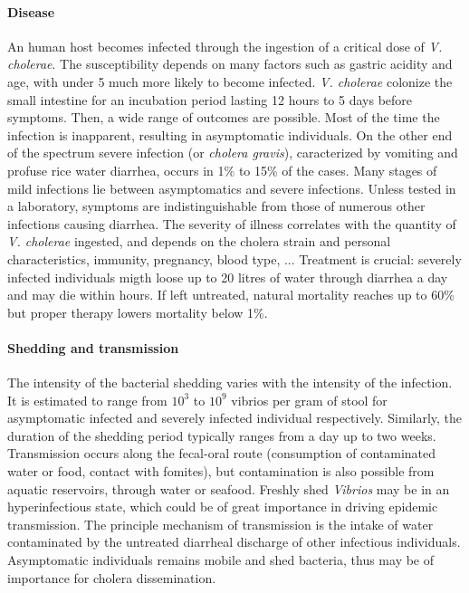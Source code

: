 \paragraph{Disease} An human host becomes infected through the ingestion of a critical dose of \emph{V. cholerae}\cite{Kaper:Cholera:1995,Nelson:CholeraTransmissionHost:2009}. The susceptibility depends on many factors such as gastric acidity and age, with under 5 much more likely to become infected\cite{Sack:Cholera:2004}. \textit{V. cholerae} colonize the small intestine for an incubation period lasting 12 hours to 5 days\cite{Azman:IncubationPeriodCholera:2013} before symptoms. Then, a wide range of outcomes are possible. Most of the time the infection is inapparent, resulting in asymptomatic individuals. On the other end of the spectrum severe infection (or \emph{cholera gravis}), caracterized by vomiting and profuse rice water diarrhea, occurs in 1\% to 15\% of the cases. Many stages of mild infections lie between asymptomatics and severe infections. Unless tested in a laboratory, symptoms are indistinguishable  from those of numerous other infections causing diarrhea\cite{King:InapparentInfectionsCholera:2008, Kaper:Cholera:1995, Nelson:CholeraTransmissionHost:2009,vandeLinde:ObservationsSpreadCholera:1965,Mccormack:CommunityStudyInapparent:1969}.  The severity of illness correlates with the quantity of \textit{V. cholerae} ingested\cite{Brouwer:DoseresponseRelationshipsEnvironmentally:2017}, and depends on the cholera strain and personal characteristics, immunity, pregnancy, blood type\cite{WHO:CholeraVaccinesWHO:2017,Azman:IncubationPeriodCholera:2013}, ...%
Treatment is crucial: severely infected individuals migth loose up to 20 litres of water through diarrhea a day and may die within hours. If left untreated, natural mortality reaches up to 60\% but proper therapy lowers mortality below 1\%\cite{Luquero:MortalityRatesCholera:2016}.

\paragraph{Shedding and transmission} The intensity of the bacterial shedding varies with the intensity of the infection. It is estimated to range from $10^3$ to $10^{9}$ vibrios per gram of stool for asymptomatic infected and severely infected individual respectively\cite{Nelson:CholeraTransmissionHost:2009}. Similarly, the duration of the shedding period typically ranges from a day up to two weeks\cite{Nelson:CholeraTransmissionHost:2009, Kaper:Cholera:1995}.
Transmission occurs along the fecal-oral route (consumption of contaminated water or food, contact with fomites), but contamination is also possible from aquatic reservoirs, through water or seafood. Freshly shed \textit{Vibrios} may be in an hyperinfectious state, which could be of great importance in driving epidemic transmission\cite{Butler:CholeraStoolBacteria:2006}. The principle mechanism of transmission is the intake of water contaminated by the untreated diarrheal discharge of other infectious individuals.
Asymptomatic individuals remains mobile and shed bacteria, thus may be of importance for cholera dissemination.

